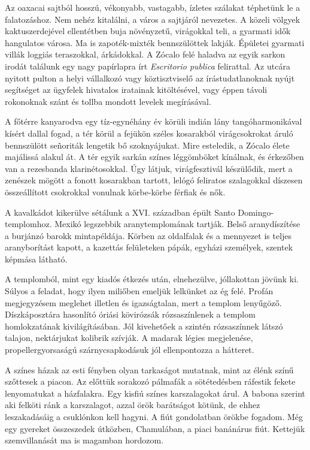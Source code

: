 Az oaxacai sajtból hosszú, vékonyabb, vastagabb, ízletes szálakat
téphetünk le a falatozáshoz. Nem nehéz kitalálni, a város a sajtjáról
nevezetes. A közeli völgyek kaktuszerdejével ellentétben buja
növényzetű, virágokkal teli, a gyarmati idők hangulatos városa. Ma
is zapoték-mixték bennszülöttek lakják. Épületei gyarmati villák
loggiás teraszokkal, árkádokkal. A Zócalo felé haladva az egyik
sarkon irodát találunk egy nagy papírlapra írt \textit{Escritorio publica}
felirattal. Az utcára nyitott pulton a helyi vállalkozó vagy köztisztviselő
az írástudatlanoknak nyújt segítséget az ügyfelek hivatalos iratainak
kitöltésével, vagy éppen távoli rokonoknak szánt és tollba mondott
levelek megírásával.

A főtérre kanyarodva egy tíz-egynéhány év körüli indián lány
tangóharmonikával kísért dallal fogad, a tér körül a fejükön széles
kosarakból virágcsokrokat áruló bennszülött señoriták lengetik bő
szoknyájukat. Mire esteledik, a Zócalo élete majálissá alakul át.
A tér egyik sarkán színes léggömböket kínálnak, és érkezőben van
a rezesbanda klarinétosokkal. Úgy látjuk, virágfesztivál készülődik,
mert a zenészek mögött a fonott kosarakban tartott, lelógó feliratos
szalagokkal díszesen összeállított csokrokkal vonulnak körbe-körbe
férfiak és nők.


A kavalkádot kikerülve sétálunk a XVI. században épült Santo
Domingo-templomhoz. Mexikó legszebbik aranytemplomának tartják.
Belső aranydíszítése a burjánzó barokk mintapéldája. Körben az
oldalfalak és a mennyezet is teljes aranyborítást kapott, a kazettás
felületeken pápák, egyházi személyek, szentek képmása látható.

A templomból, mint egy kiadós étkezés után, elnehezülve, jóllakottan
jövünk ki. Súlyos a feladat, hogy ilyen miliőben emeljük lelkünket
az ég felé. Profán megjegyzésem meglehet illetlen és igazságtalan,
mert a templom lenyűgöző. Díszkáposztára hasonlító óriási kövirózsák
rózsaszínlenek a templom homlokzatának kivilágításában. Jól
kivehetőek a szintén rózsaszínnek látszó talajon, nektárjukat kolibrik
szívják. A madarak légies megjelenése, propellergyorsaságú szárnycsapkodásuk
jól ellenpontozza a hátteret.

A színes házak az esti fényben olyan tarkaságot mutatnak, mint az
élénk színű szőttesek a piacon. Az előttük sorakozó pálmafák a sötétedésben
ráfestik fekete lenyomatukat a házfalakra. Egy kisfiú színes
karszalagokat árul. A babona szerint aki felköti ránk a karszalagot,
azzal örök barátságot kötünk, de ehhez leszakadásáig a csuklónkon
kell hagyni. A fiút gondolatban örökbe fogadom. Még egy gyereket
összeszedek útközben, Chamulában, a piaci banánárus fiút. Kettejük
szemvillanását ma is magamban hordozom.

